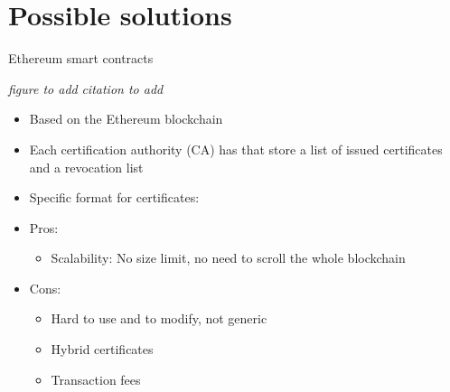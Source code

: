 \section[Possible solutions]{Possible solutions}


\begin{frame}{Ethereum smart contracts}

\emph{figure to add}
\emph{citation to add }

\begin{itemize}
\item Based on the Ethereum blockchain
\item Each certification authority (CA) has  that store a list of issued certificates and a revocation list
\item Specific format for certificates: 
\item Pros:
\begin{itemize}
\item Scalability: No size limit, no need to scroll the whole blockchain
\end{itemize}
\item Cons:
\begin{itemize}
\item Hard to use and to modify, not generic
\item Hybrid certificates
\item Transaction fees
\end{itemize}

\end{itemize}


\end{frame}





